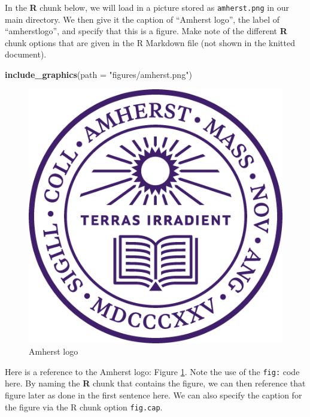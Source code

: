\documentclass[12pt, twoside]{amherstthesis}
\newenvironment{Shaded}{\begin{snugshade}}{\end{snugshade}}
\newcommand{\DataTypeTok}[1]{\textcolor[rgb]{0.13,0.29,0.53}{#1}}
\newcommand{\KeywordTok}[1]{\textcolor[rgb]{0.13,0.29,0.53}{\textbf{#1}}}
\newcommand{\NormalTok}[1]{#1}
\newcommand{\StringTok}[1]{\textcolor[rgb]{0.31,0.60,0.02}{#1}}
\theoremstyle{definition}
\theoremstyle{definition}
\theoremstyle{definition}
\theoremstyle{remark}
\begin{document}
In the \textbf{R} chunk below, we will load in a picture stored as \texttt{amherst.png} in our main directory. We then give it the caption of ``Amherst logo'', the label of ``amherstlogo'', and specify that this is a figure. Make note of the different \textbf{R} chunk options that are given in the R Markdown file (not shown in the knitted document).
\begin{Shaded}
\begin{Highlighting}[]
\KeywordTok{include_graphics}\NormalTok{(}\DataTypeTok{path =} \StringTok{"figures/amherst.png"}\NormalTok{)}
\end{Highlighting}
\end{Shaded}
\begin{figure}

{\centering \includegraphics[width=0.5\linewidth]{figures/amherst} 

}

\caption{Amherst logo}\label{fig:amherstlogo}
\end{figure}
Here is a reference to the Amherst logo: Figure \ref{fig:amherstlogo}. Note the use of the \texttt{fig:} code here. By naming the \textbf{R} chunk that contains the figure, we can then reference that figure later as done in the first sentence here. We can also specify the caption for the figure via the R chunk option \texttt{fig.cap}.

\clearpage
\end{document}
